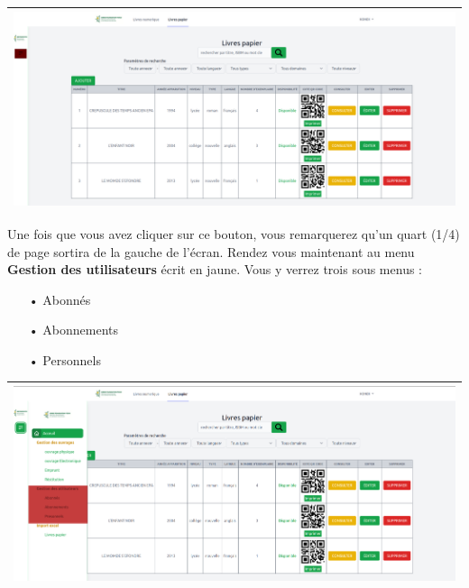 \documentclass[12pt,a4paper]{article}
\begin{document}
\begin{center}
\begin{tabular}{|p{17cm}|}
\hline 
\includegraphics[width=\textwidth]{img/sidebar.png} \\ 
\hline 
\end{tabular} 
\end{center}

Une fois que vous avez cliquer sur ce bouton, vous remarquerez qu'un quart (1/4) de page 
sortira de la gauche de l'écran. Rendez vous maintenant au menu \textbf{Gestion des
utilisateurs} écrit en jaune. Vous y verrez trois sous menus :
\begin{itemize}
\item[•] Abonnés
\item[•] Abonnements
\item[•] Personnels
\end{itemize}

\begin{center}
\begin{tabular}{|p{17cm}|}
\hline 
\includegraphics[width=\textwidth]{img/gestion_utilisateurs2.png} \\ 
\hline 
\end{tabular} 
\end{center}
\end{document}
